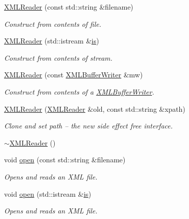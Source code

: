 \begin{DoxyCompactItemize}
\mbox{\hyperlink{classADATXML_1_1XMLReader_a85d8af8a27febdd66251e20bd96ccc32}{X\+M\+L\+Reader}} (const std\+::string \&filename)
\begin{DoxyCompactList}\small\item\em Construct from contents of file. \end{DoxyCompactList}\item 
\mbox{\hyperlink{classADATXML_1_1XMLReader_a8025cb1c53d6ceb8a694bdbd8e1f383b}{X\+M\+L\+Reader}} (std\+::istream \&\mbox{\hyperlink{x_8cc_a81abbbdef81e25584a2eab888e643d3d}{is}})
\begin{DoxyCompactList}\small\item\em Construct from contents of stream. \end{DoxyCompactList}\item 
\mbox{\hyperlink{classADATXML_1_1XMLReader_a6829255c2dd448f4bf315f6fd0b380a1}{X\+M\+L\+Reader}} (const \mbox{\hyperlink{classADATXML_1_1XMLBufferWriter}{X\+M\+L\+Buffer\+Writer}} \&mw)
\begin{DoxyCompactList}\small\item\em Construct from contents of a \mbox{\hyperlink{classADATXML_1_1XMLBufferWriter}{X\+M\+L\+Buffer\+Writer}}. \end{DoxyCompactList}\item 
\mbox{\hyperlink{classADATXML_1_1XMLReader_aef69d83a0f47db461436fc2fd3bb7723}{X\+M\+L\+Reader}} (\mbox{\hyperlink{classADATXML_1_1XMLReader}{X\+M\+L\+Reader}} \&old, const std\+::string \&xpath)
\begin{DoxyCompactList}\small\item\em Clone and set path -- the new side effect free interface. \end{DoxyCompactList}\item 
\mbox{\hyperlink{classADATXML_1_1XMLReader_a98c4936a3366f39443113290b7bd164a}{$\sim$\+X\+M\+L\+Reader}} ()
\item 
void \mbox{\hyperlink{classADATXML_1_1XMLReader_ad5dcbd08800bc67ac4a91f93cb1504b0}{open}} (const std\+::string \&filename)
\begin{DoxyCompactList}\small\item\em Opens and reads an X\+ML file. \end{DoxyCompactList}\item 
void \mbox{\hyperlink{classADATXML_1_1XMLReader_a7938cc7e08b0381e467eb7b916cbbd97}{open}} (std\+::istream \&\mbox{\hyperlink{x_8cc_a81abbbdef81e25584a2eab888e643d3d}{is}})
\begin{DoxyCompactList}\small\item\em Opens and reads an X\+ML file. \end{DoxyCompactList}\item 

\end{DoxyCompactItemize}

